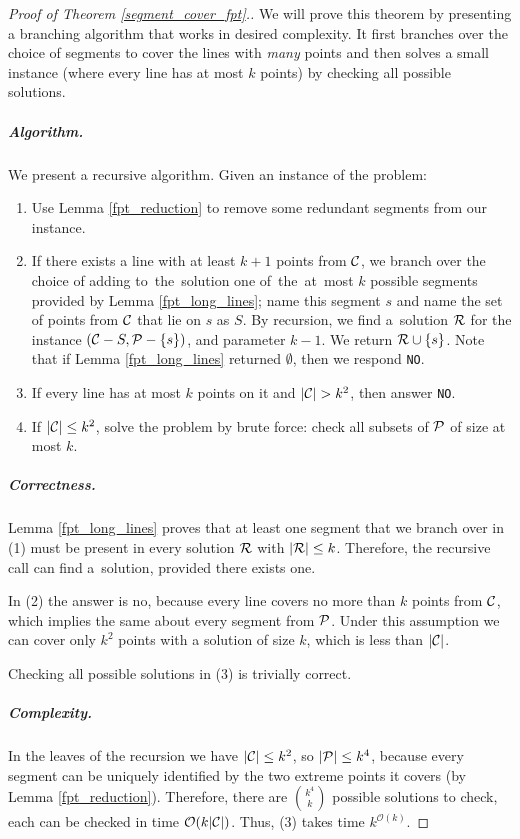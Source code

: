 \begin{proof}[Proof of Theorem \ref{segment_cover_fpt}.]
We will prove this theorem by presenting a branching algorithm that
works in desired complexity. It first branches over the
choice of segments to cover the lines with \textit{many} points
and then solves a small instance (where every line has at most $k$ points)
by checking all possible solutions.

\subparagraph{Algorithm.}
We present a recursive algorithm. Given an instance of the problem:

\begin{enumerate}[label={(\arabic*)}]
\item Use Lemma \ref{fpt_reduction} to remove some redundant segments from our instance.
\item If there exists a line with at least $k+1$ points from $\mathcal{C}$,
we branch over the choice of adding to~the~solution
one of~the~at~most $k$ possible segments
provided by Lemma \ref{fpt_long_lines}; name this segment $s$
and name the set of points from $\mathcal{C}$ that lie on $s$ as $S$.
By recursion, we find a~solution $\mathcal{R}$
for the instance $(\mathcal{C} - S, \mathcal{P} - \{s\})$,
and parameter $k-1$. We return $\mathcal{R} \cup \{s\}$.
Note that if Lemma \ref{fpt_long_lines} returned $\emptyset$,
then we respond \texttt{NO}.
\item If every line has at most $k$ points on it and $|\mathcal{C}| > k^2$,
then answer \texttt{NO}.
\item If $|\mathcal{C}| \le k^2$, solve the problem by brute force:
check all subsets of $\mathcal{P}$ of size at most $k$.
\end{enumerate}

\subparagraph{Correctness.}

Lemma \ref{fpt_long_lines} proves that at least one segment that we
branch over in (1) must be present in every solution $\mathcal{R}$ with $|\mathcal{R}| \le k$.
Therefore, the recursive call can find a~solution, provided there exists one.

In (2) the answer is no, because every line covers no more than $k$ points
from $\mathcal{C}$, which implies the same about every segment from $\mathcal{P}$.
Under this assumption
we can cover only $k^2$ points with a solution of size $k$, which is less
than $|\mathcal{C}|$.

Checking all possible solutions in (3) is trivially correct.


\subparagraph{Complexity.}

In the leaves of the recursion we have $|\mathcal{C}| \le k^2$, so $|\mathcal{P}| \le k^4$,
because every segment can be uniquely identified by the two extreme points it covers
(by Lemma \ref{fpt_reduction}). Therefore, there are $\binom{k^4}{k}$
possible solutions to check, each can be checked in time $\mathcal{O}(k|\mathcal{C}|)$.
Thus, (3) takes time $k^{\mathcal{O}(k)}$.



\end{proof}
